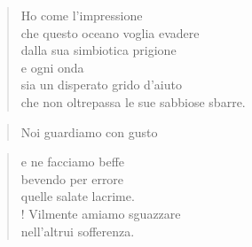 
\begin{verse}
    Ho come l'impressione\\
    che questo oceano voglia evadere\\
    dalla sua simbiotica prigione\\
    e ogni onda\\
    sia un disperato grido d'aiuto\\
    che non oltrepassa
    le sue sabbiose sbarre.\\
    \end{verse}
    \begin{verse}
    Noi guardiamo \hfill con gusto
    \end{verse}
    \vspace{-0.9cm}
    
    \begin{verse}
    e ne facciamo beffe\\
    bevendo per errore\\
    quelle salate lacrime.\\!
    Vilmente amiamo sguazzare\\
    nell'altrui sofferenza.
\end{verse}

